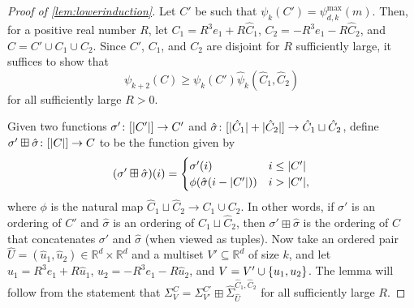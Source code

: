 \documentclass[11pt]{amsart}
\theoremstyle{definition}
\DeclarePairedDelimiter{\set}{\{}{\}}
\DeclarePairedDelimiter{\abs}{\lvert}{\rvert}
\newcommand{\perm}{\psi^{\mathrm{max}}}
\newcommand{\RR}{\mathbb{R}}
\begin{document}
\begin{proof}[Proof of \cref{lem:lowerinduction}]
Let $C'$ be such that $\psi_k(C') = \perm_{d,k}(m)$. Then, for a positive real number $R$, let $C_1 = R^3e_1 + R\hat C_1$, $C_2 = -R^3 e_1 - R\hat C_2$, and $C = C' \cup C_1 \cup C_2$. Since $C'$, $C_1$, and $C_2$ are disjoint for $R$ sufficiently large, it suffices to show that
\[\psi_{k+2}(C) \geq \psi_k(C') \hat \psi_k(\hat C_1, \hat C_2)\]
for all sufficiently large $R > 0$.

Given two functions $\sigma' \colon [\abs{C'}] \to C'$ and $\hat \sigma \colon [\abs{\hat C_1} + \abs{\hat C_2}] \to \hat C_1 \sqcup \hat C_2$, define $\sigma' \boxplus \hat \sigma \colon [\abs{C}] \to C$ to be the function given by
\[
(\sigma' \boxplus \hat \sigma)(i) = \begin{cases}
\sigma'(i) & i \leq \abs{C'} \\
\phi(\hat \sigma(i - \abs{C'})) & i > \abs{C'},
\end{cases}\]
where $\phi$ is the natural map $\hat C_1 \sqcup \hat C_2 \to C_1 \cup C_2$.  In other words, if $\sigma'$ is an ordering of $C'$ and $\hat \sigma$ is an ordering of $\hat C_1 \sqcup \hat C_2$, then $\sigma' \boxplus \hat \sigma$ is the ordering of $C$ that concatenates $\sigma'$ and $\hat{\sigma}$ (when viewed as tuples).
Now take an ordered pair $\hat U = (\hat u_1, \hat u_2) \in \RR^d \times \RR^d$ and a multiset $V' \subseteq \RR^d$ of size $k$, and let $u_1 = R^3 e_1 + R\hat u_1$, $u_2 = -R^3 e_1 - R\hat u_2$, and $V = V' \cup \set{u_1,u_2}$. The lemma will follow from the statement that $\Sigma_{V}^C = \Sigma_{V'}^{C'} \boxplus \hat \Sigma_{\hat U}^{\hat C_1,\hat C_2}$ for all sufficiently large $R$. 


\end{proof}
\end{document}
